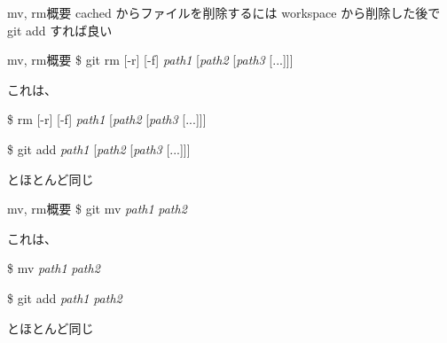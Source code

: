 
\begin{frame}[t]{mv, rm}{概要}
  cached からファイルを削除するには workspace から削除した後で git add すれば良い
  \vspace{2ex}

  \vspace{2ex}


  \vspace{2ex}

\end{frame}


\begin{frame}[t]{mv, rm}{概要}
  \$ git rm [\hyphen r] [\hyphen f] \textit{path1} [\textit{path2} [\textit{path3} [...]]]
  \vspace{2ex}

  これは、
  \vspace{2ex}

  \$ rm [\hyphen r] [\hyphen f] \textit{path1} [\textit{path2} [\textit{path3} [...]]]

  \$ git add \textit{path1} [\textit{path2} [\textit{path3} [...]]]
  \vspace{2ex}

  とほとんど同じ
  \vspace{2ex}

\end{frame}


\begin{frame}[t]{mv, rm}{概要}
  \$ git mv \textit{path1} \textit{path2}
  \vspace{2ex}

  これは、
  \vspace{2ex}

  \$ mv \textit{path1} \textit{path2}

  \$ git add \textit{path1} \textit{path2}
  \vspace{2ex}

  とほとんど同じ
\end{frame}
